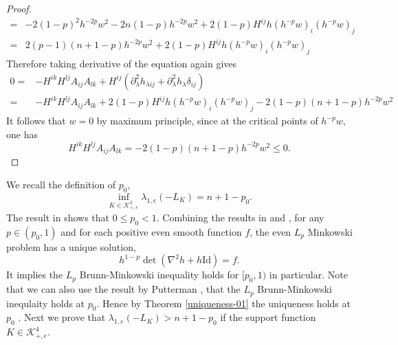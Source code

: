 \documentclass[reqno]{amsart}
\theoremstyle{remark}
\def\cK{{\mathcal K}}
\theoremstyle{plain}
\begin{document}
\begin{proof}
\begin{equation}
\begin{aligned}
        =&-2(1-p)^2h^{-2p}w^2-2n(1-p)h^{-2p}w^2+2(1-p)H^{ij}h(h^{-p}w)_{i}(h^{-p}w)_j\\
        =&2(p-1)(n+1-p)h^{-2p}w^2+2(1-p)H^{ij}h(h^{-p}w)_i(h^{-p}w)_j
    \end{aligned}
\end{equation}
Therefore taking derivative of the equation again gives \begin{equation}
\begin{aligned}
     0=&-H^{ik}H^{lj}A_{ij}A_{lk}+H^{ij}(\partial^2_\lambda h_{\lambda ij}+\partial^2_\lambda h_\lambda \delta_{ij})\\
     =&-H^{ik}H^{lj}A_{ij}A_{lk}+2(1-p)H^{ij}h(h^{-p}w)_i(h^{-p}w)_j-2(1-p)(n+1-p)h^{-2p}w^2\end{aligned}
    \end{equation}
    It follows that $w=0$ by maximum principle, since at the critical points of $h^{-p}w$, one has \[H^{ik}H^{lj}A_{ij}A_{lk}=-2(1-p)(n+1-p)h^{-2p}w^2\leq 0.\]
\end{proof}
We recall the definition of $p_0$, 
\[
\inf_{K\in \cK^2_{+, e}} \lambda_{1, e}(-L_K)=n+1-p_0.
\]
The result in \cite{KM01} shows that $0\leq p_0<1$. Combining the results in \cite{KM01} and \cite{CHLL}, for any $p\in (p_0, 1)$ and for each positive even smooth function $f$, the even $L_p$ Minkowski problem has a unique solution, 
\[
h^{1-p}\det(\nabla^2 h+h\text{Id})=f.
\]
It implies the $L_p$ Brunn-Minkowski inequality holds for $[p_0, 1)$ in particular.
Note that we can also use the result by Putterman \cite[Propostion 1.5]{Put}, that the $L_p$ Brunn-Minkowski inequlaity holds at $p_0$. 
Hence by Theorem \ref{uniqueness-01} the uniqueness holds at $p_0$ .
Next we prove that $\lambda_{1, e}(-L_K)>n+1-p_0$ if the support function $K\in \cK^4_{+, e}$. 
\end{document}
